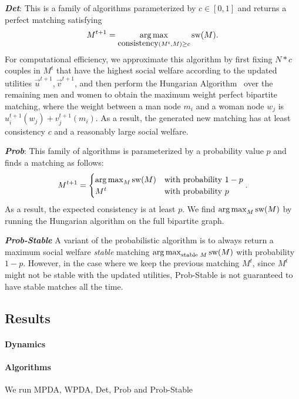 \textit{\textbf{Det}}: This is a family of algorithms parameterized by $c \in [0, 1]$ and returns a perfect matching satisfying $$M^{t+1} = \operatorname*{arg\,max}_{\mbox{consistency}(M^t, M) \ge c}{\mbox{sw}(M)}.$$
For computational efficiency, we approximate this algorithm by first fixing $N * c$ couples in $M^t$ that have the highest social welfare according to the updated utilities $\overrightarrow{u}^{t+1}, \overrightarrow{v}^{t+1}$, and then perform the Hungarian Algorithm~\cite{Kuhn55thehungarian,Kuhn56thehungarian,Munkres1957Assignment} over the remaining men and women to obtain the maximum weight perfect bipartite matching, where the weight between a man node $m_i$ and a woman node $w_j$ is $u_i^{t+1}(w_j) + v_j^{t+1}(m_i)$. As a result, the generated new matching has at least consistency $c$ and a reasonably large social welfare.

\textit{\textbf{Prob}}: This family of algorithms is parameterized by a probability value $p$ and finds a matching as follows:
$$M^{t+1} = \begin{cases} \operatorname*{arg\,max}_M{\mbox{sw}(M)} &\text{with probability $1-p$}\\ M^t &\text{with probability $p$}\end{cases}.$$
As a result, the expected consistency is at least $p$. We find $\operatorname*{arg\,max}_M{\mbox{sw}(M)}$ by running the Hungarian algorithm on the full bipartite graph.

\textit{\textbf{Prob-Stable}} A variant of the probabilistic algorithm is to always return a maximum social welfare \textit{stable} matching $\operatorname*{arg\,max}_{\text{stable $M$}}{\mbox{sw}(M)}$ with probability $1-p$. However, in the case where we keep the previous matching $M^t$, since $M^t$ might not be stable with the updated utilities, Prob-Stable is not guaranteed to have stable matches all the time.


\subsection{Results}
\paragraph{Dynamics}

\paragraph{Algorithms} We run MPDA, WPDA, Det, Prob and Prob-Stable 

